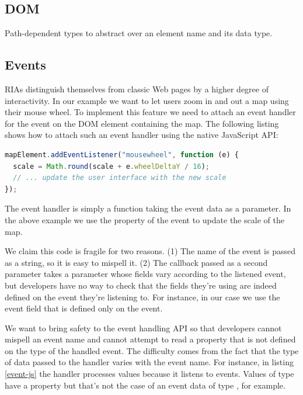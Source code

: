 \documentclass[runningheads,a4paper]{llncs}
\begin{document}
\subsection{DOM}

Path-dependent types to abstract over an element name and its data type.

\subsection{Events}

RIAs distinguish themselves from classic Web pages by a higher degree of interactivity. In our
example we want to let users zoom in and out a map using their mouse wheel. To implement this
feature we need to attach an event handler for the  event on the DOM element
containing the map. The following listing shows how to attach such an event handler using the native
JavaScript API:

\begin{lstlisting}[language=JavaScript,label=event-js,caption=Native JavaScript API to handle
events]
mapElement.addEventListener("mousewheel", function (e) {
  scale = Math.round(scale + e.wheelDeltaY / 16);
  // ... update the user interface with the new scale
});
\end{lstlisting}

The event handler is simply a function taking the event data as a parameter. In the above example we
use the  property of the event to update the scale of the map.

We claim this code is fragile for two reasons. (1) The name of the event is passed as a string, so
it is easy to mispell it. (2) The callback passed as a second parameter takes a parameter 
whose fields vary according to the listened event, but developers have no way to check that the
fields they’re using are indeed defined on the event they’re listening to. For instance, in our case
we use the  event field that is defined only on the  event.

We want to bring safety to the event handling API so that developers cannot mispell an event name
and cannot attempt to read a property that is not defined on the type of the handled event. The
difficulty comes from the fact that the type of data passed to the handler varies with the event
name. For instance, in listing \ref{event-js} the handler processes  values
because it listens to  events. Values of type  have a
property  but that’s not the case of an event data of type ,
for example.
\end{document}
